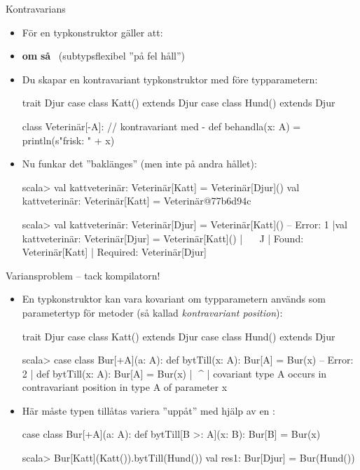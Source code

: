 \begin{Slide}{Kontravarians }
\begin{itemize}\SlideFontSmall
\item För en  typkonstruktor  gäller att: 
\item[] \textbf{om}  \textbf{så} ~(subtypsflexibel ''på fel håll'')
\item Du skapar en kontravariant typkonstruktor med \code{-} före typparametern:
\begin{Code}
trait Djur 
case class Katt() extends Djur
case class Hund() extends Djur

class Veterinär[-A]:                            // kontravariant med -
  def behandla(x: A) = println(s"frisk: " + x)  
\end{Code}
\pause
\item Nu funkar det ''baklänges'' (men inte på andra hållet):
\begin{REPLsmall}
scala> val kattveterinär: Veterinär[Katt] = Veterinär[Djur]()
val kattveterinär: Veterinär[Katt] = Veterinär@77b6d94c

scala> val kattveterinär: Veterinär[Djur] = Veterinär[Katt]()
-- Error:
1 |val kattveterinär: Veterinär[Djur] = Veterinär[Katt]()
  |                                     ^^^^^^^^^^^^^^^^^
  |                                     Found:    Veterinär[Katt]
  |                                     Required: Veterinär[Djur]
\end{REPLsmall}
\end{itemize}

\end{Slide}

\begin{Slide}{Variansproblem -- tack kompilatorn!}
\begin{itemize}\SlideFontSmall
\item En typkonstruktor kan  vara kovariant om typparametern används som parametertyp för metoder (så kallad \emph{kontravariant position}):
\begin{Code}
trait Djur
case class Katt() extends Djur
case class Hund() extends Djur
\end{Code}
\begin{REPLsmall}
scala> case class Bur[+A](a: A): 
         def bytTill(x: A): Bur[A] = Bur(x)
-- Error:
2 |  def bytTill(x: A): Bur[A] = Bur(x)
  |          ^^^^
  |  covariant type A occurs in contravariant position in type A of parameter x
\end{REPLsmall}
\item Här måste typen tillåtas variera ''uppåt'' med hjälp av en :
\begin{Code}
case class Bur[+A](a: A): 
  def bytTill[B >: A](x: B): Bur[B] = Bur(x)
\end{Code}
\begin{REPLsmall}
scala> Bur[Katt](Katt()).bytTill(Hund())
val res1: Bur[Djur] = Bur(Hund())
\end{REPLsmall}
\end{itemize}
\end{Slide}


